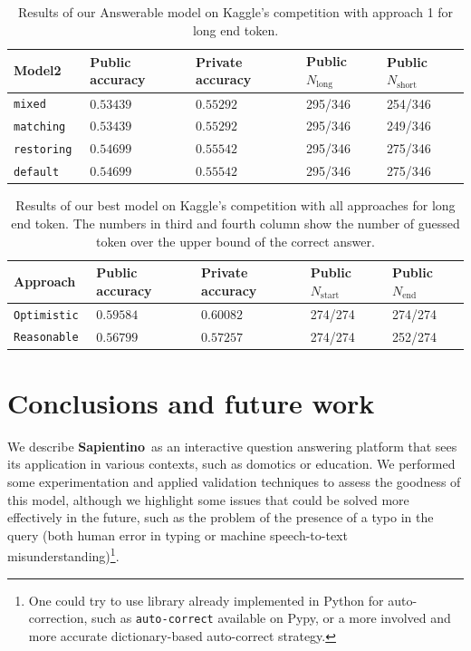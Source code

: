 \documentclass[10pt,hidelinks]{article}
\newcommand\nomefico{\textbf{Sapientino}}
\def\colOne{white}
\def\colTwo{pblue!10}
\def\colHea{pblue!35}
\begin{document}
\begin{table}[ht!] 
	\footnotesize\centering
	\rowcolors{2}{\colOne}{\colTwo}
\begin{tabular}{|p{17mm}|p{21mm}|p{21mm}|p{17mm}|p{17mm}|}
		\hline\rowcolor{\colHea} Model2 & Public accuracy & Private accuracy & Public $N_{\text{long}}$ & Public $N_{\text{short}}$ \\\hline\hline
		\tt mixed & $0.53439$ & $0.55292$ & 295/346 & 254/346 \\
		\tt matching & $0.53439$ & $0.55292$ & 295/346 & 249/346 \\
		\tt restoring & $0.54699$ & $0.55542$ & 295/346 & 275/346 \\
		\tt default & $0.54699$ & $0.55542$ & 295/346 & 275/346\\
		\hline
		\end{tabular}
	\caption{Results of our Answerable model on Kaggle's competition with approach 1 for long end token.}\label{model2Result}
\end{table}

\begin{table}[ht!] 
	\footnotesize\centering
	\rowcolors{2}{\colOne}{\colTwo}
\begin{tabular}{|p{17mm}|p{21mm}|p{21mm}|p{17mm}|p{17mm}|}
		\hline\rowcolor{\colHea} Approach & Public accuracy & Private accuracy & Public $N_{\text{start}}$ & Public $N_{\text{end}}$ \\\hline\hline
		\tt Optimistic & $0.59584$ & $0.60082$ & 274/274 & 274/274\\
		\tt Reasonable & $0.56799$ & $0.57257$ & 274/274 & 252/274 \\
		\hline
		\end{tabular}
	\caption{Results of our best model on Kaggle's competition with all approaches for long end token. The numbers in third and fourth column show the number of guessed token over the upper bound of the correct answer.}\label{compareResult}
\end{table}

\section{Conclusions and future work}\label{sec:conclusions_and_future_work}

We describe \nomefico~as an interactive question answering platform that sees its application in various contexts, such as domotics or education.
We performed some experimentation and applied validation techniques to assess the goodness of this model, although we highlight some issues that could be solved more effectively in the future, such as the problem of the presence of a typo in the query (both human error in typing or machine speech-to-text misunderstanding)\footnote{One could try to use library already implemented in Python for auto-correction, such as \texttt{auto-correct} available on Pypy, or a more involved and more accurate dictionary-based auto-correct strategy.}.
\end{document}
